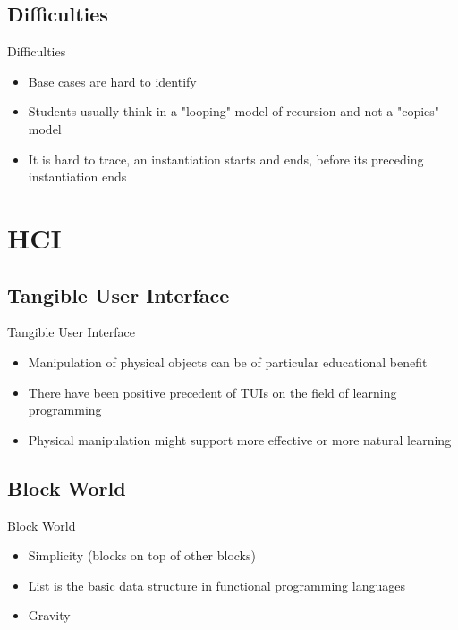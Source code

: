 \subsection {Difficulties}
\begin{frame} {Difficulties}
\begin{itemize}
\pause \item Base cases are hard to identify \cite{haberman02}
\pause \item Students usually think in a "looping" model of recursion and not a "copies" model \cite{kahney83}
\pause \item It is hard to trace, an instantiation starts and ends, before its preceding instantiation ends \cite{ginat99}
\end{itemize}
\end{frame}



\section{HCI}

\subsection {Tangible User Interface}
\begin{frame} {Tangible User Interface}
\begin{itemize}
\pause \item Manipulation of physical objects can be of particular educational benefit \cite{montessori12}
\pause \item There have been positive precedent of TUIs on the field of learning programming \cite{fernaeus06} \cite{suzuki95}
\pause \item Physical manipulation might support more effective or more natural learning \cite{sluis04} \cite{terrenghi05} \cite{zuckerman05}  
\end{itemize}
\end{frame}

\subsection {Block World}
\begin{frame} {Block World}
\begin{itemize}
\pause \item Simplicity (blocks on top of other blocks)
\pause \item List is the basic data structure in functional programming languages
\pause \item Gravity
\end{itemize} 
\end{frame}

